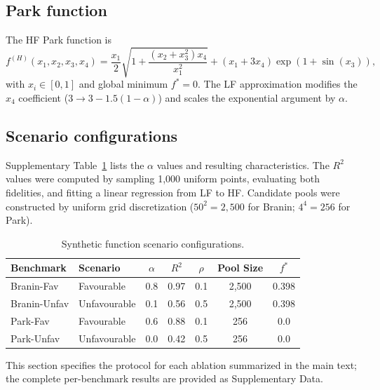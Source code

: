 \documentclass[11pt,a4paper]{article}%
\begin{document}
\subsection{Park function}
The HF Park function is
\begin{equation}
f^{(H)}(x_1, x_2, x_3, x_4) = \frac{x_1}{2}\sqrt{1 + \frac{(x_2 + x_3^2)x_4}{x_1^2}} + (x_1 + 3x_4)\exp\!\left(1 + \sin(x_3)\right),
\end{equation}
with $x_i \in [0,1]$ and global minimum $f^* = 0$. The LF approximation modifies
the $x_4$ coefficient ($3 \rightarrow 3 - 1.5(1-\alpha)$) and scales the exponential
argument by $\alpha$.

\subsection{Scenario configurations}
Supplementary Table~\ref{supptab:synthetic_scenarios} lists the $\alpha$ values and resulting
characteristics. The $R^2$ values were computed by sampling 1,000 uniform points,
evaluating both fidelities, and fitting a linear regression from LF to HF. Candidate pools
were constructed by uniform grid discretization ($50^2 = 2{,}500$ for Branin; $4^4 = 256$
for Park).

\begin{table}[h]
\centering
\caption{Synthetic function scenario configurations.}
\label{supptab:synthetic_scenarios}
\begin{tabular}{llccccc}
\toprule
\textbf{Benchmark} & \textbf{Scenario} & $\alpha$ & $R^2$ & $\rho$ & \textbf{Pool Size} & $f^*$ \\
\midrule
Branin-Fav & Favourable & 0.8 & 0.97 & 0.1 & 2,500 & 0.398 \\
Branin-Unfav & Unfavourable & 0.1 & 0.56 & 0.5 & 2,500 & 0.398 \\
Park-Fav & Favourable & 0.6 & 0.88 & 0.1 & 256 & 0.0 \\
Park-Unfav & Unfavourable & 0.0 & 0.42 & 0.5 & 256 & 0.0 \\
\bottomrule
\end{tabular}
\end{table}



This section specifies the protocol for each ablation summarized in the main text; the
complete per-benchmark results are provided as Supplementary Data.
\end{document}
